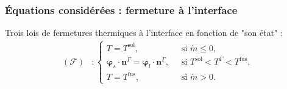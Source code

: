 \documentclass{beamer}
\newcommand{\inte}{\Gamma}
\newcommand{\fus}{\text{fus}}
\newcommand{\sol}{\text{sol}}
\newcommand{\vect}[1]{\bm{#1}}
\newcommand{\norm}{\vect{n}}
\begin{document}
\begin{frame}
    \frametitle{Équations considérées : fermeture à l'interface}
\footnotesize


\begin{center}
		\begin{tikzpicture}[scale = 0.5, every node/.style={scale=0.5}]
			
		\end{tikzpicture}

\end{center}
\begin{ceablock}{Trois lois de fermetures thermiques à l'interface en fonction de "son état" :}
\begin{align}
	(\mathcal{F}) &:\left\{ \begin{array}{ll}
T=T^\sol,  \; &\text{ si } \Dot{m} \leq 0, \\
\vect{\varphi}_s \cdot \norm^\inte= \vect{\varphi}_l \cdot \norm^\inte,  \; &\text{ si } T^\sol < T^\inte < T^\fus,\\
T=T^\fus,   \; &\text{ si } \Dot{m}>0.
 \end{array}\right.
\end{align}
\end{ceablock}
\end{frame}
\end{document}
